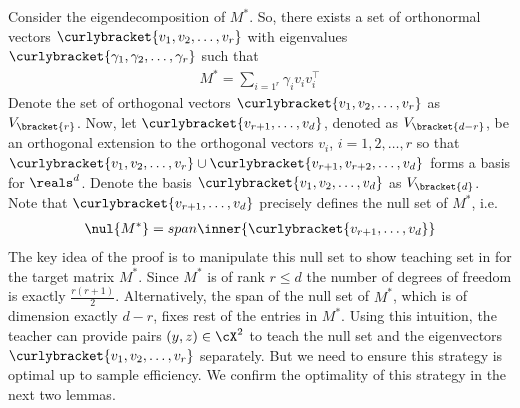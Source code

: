Consider the eigendecomposition of $M^*$. So, there exists a set of orthonormal vectors $\curlybracket{v_1,v_2,\ldots,v_r}$ with eigenvalues $\curlybracket{\gamma_1,\gamma_2,\ldots, \gamma_r}$ such that 
\begin{align}
    M^* = \sum_{i=1^r} \gamma_i v_iv_i^{\top} \label{eq: target}
\end{align}
Denote the set of orthogonal vectors $\curlybracket{v_1,v_2,\ldots,v_r}$ as $V_{\bracket{r}}$.
Now, let $\curlybracket{v_{r+1},\dots,v_d}$, denoted as $V_{\bracket{d - r}}$, be an orthogonal extension to the orthogonal vectors $v_i$, $i = 1,2,\ldots, r$ so that $\curlybracket{v_1,v_2,\ldots,v_r} \cup \curlybracket{v_{r+1},v_{r+2},\ldots,v_d}$ forms a basis for $\reals^d$. Denote the basis $\curlybracket{v_{1},v_{2},\ldots,v_d}$ as $V_{\bracket{d}}$.
Note that $\curlybracket{v_{r+1},\dots,v_d}$ precisely defines the null set of $M^*$, i.e.
\begin{align*}
    \nul{M^*} = span\inner{\curlybracket{v_{r+1},\ldots,v_d}}
\end{align*}
The key idea of the proof is to manipulate this null set to show teaching set in  for the target matrix $M^*$. Since $M^*$ is of rank $r \le d$ the number of degrees of freedom is exactly $\frac{r(r+1)}{2}$. Alternatively, the span of the null set of $M^*$, which is of dimension exactly $d-r$, fixes rest of the entries in $M^*$. Using this intuition, the teacher can provide pairs $(y,z) \in \cX^2$ to teach the null set and the eigenvectors $\curlybracket{v_1,v_2,\ldots,v_r}$ separately. But we need to ensure this strategy is optimal up to sample efficiency. We confirm the optimality of this strategy in the next two lemmas.

